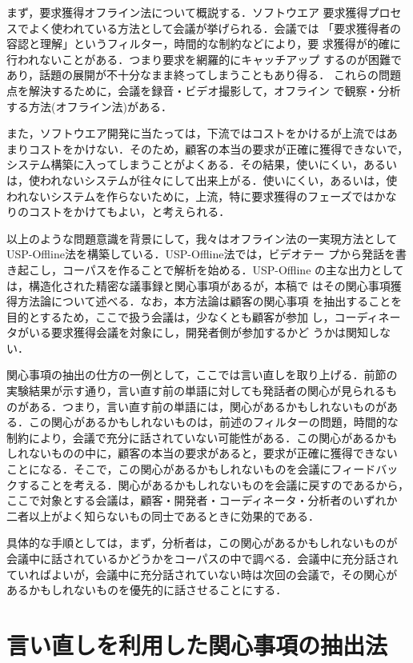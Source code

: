 まず，要求獲得オフライン法\cite{doi94a}について概説する．ソフトウエア
要求獲得プロセスでよく使われている方法として会議が挙げられる．会議では
「要求獲得者の容認と理解」というフィルター，時間的な制約などにより，要
求獲得が的確に行われないことがある．つまり要求を網羅的にキャッチアップ
するのが困難であり，話題の展開が不十分なまま終ってしまうこともあり得る．
これらの問題点を解決するために，会議を録音・ビデオ撮影して，オフライン
で観察・分析する方法(オフライン法)がある．

また，ソフトウエア開発に当たっては，下流ではコストをかけるが上流ではあ
まりコストをかけない．そのため，顧客の本当の要求が正確に獲得できないで，
システム構築に入ってしまうことがよくある．その結果，使いにくい，あるい
は，使われないシステムが往々にして出来上がる．使いにくい，あるいは，使
われないシステムを作らないために，上流，特に要求獲得のフェーズではかな
りのコストをかけてもよい，と考えられる\cite{doi93b}．

以上のような問題意識を背景にして，我々はオフライン法の一実現方法として
USP-Offline法を構築している\cite{kata96a}．USP-Offline法では，ビデオテー
プから発話を書き起こし，コーパスを作ることで解析を始める．USP-Offline
の主な出力としては，構造化された精密な議事録と関心事項があるが，本稿で
はその関心事項獲得方法論について述べる．なお，本方法論は顧客の関心事項
を抽出することを目的とするため，ここで扱う会議は，少なくとも顧客が参加
し，コーディネータがいる要求獲得会議を対象にし，開発者側が参加するかど
うかは関知しない．

関心事項の抽出の仕方の一例として，ここでは言い直しを取り上げる．前節の
実験結果が示す通り，言い直す前の単語に対しても発話者の関心が見られるも
のがある．つまり，言い直す前の単語には，関心があるかもしれないものがあ
る．この関心があるかもしれないものは，前述のフィルターの問題，時間的な
制約により，会議で充分に話されていない可能性がある．この関心があるかも
しれないものの中に，顧客の本当の要求があると，要求が正確に獲得できない
ことになる．そこで，この関心があるかもしれないものを会議にフィードバッ
クすることを考える．関心があるかもしれないものを会議に戻すのであるから，
ここで対象とする会議は，顧客・開発者・コーディネータ・分析者のいずれか
二者以上がよく知らないもの同士であるときに効果的である．

具体的な手順としては，まず，分析者は，この関心があるかもしれないものが
会議中に話されているかどうかをコーパスの中で調べる．会議中に充分話され
ていればよいが，会議中に充分話されていない時は次回の会議で，その関心が
あるかもしれないものを優先的に話させることにする．

\section{言い直しを利用した関心事項の抽出法}

